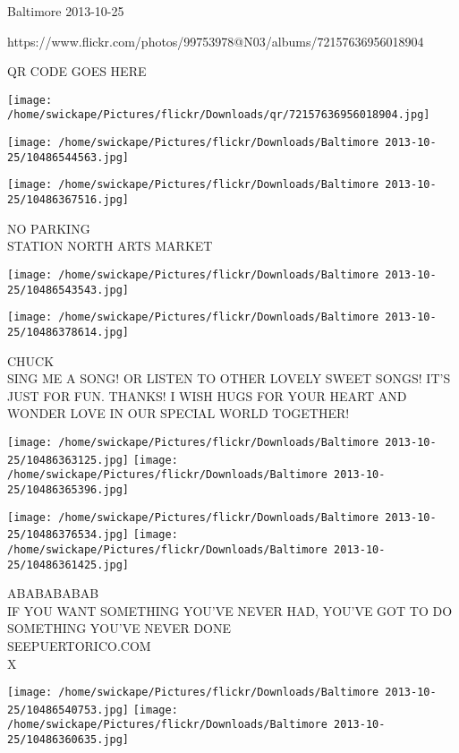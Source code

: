 \documentclass[10pt,letterpaper]{article}
\begin{document}
Baltimore 2013-10-25

https://www.flickr.com/photos/99753978@N03/albums/72157636956018904

QR CODE GOES HERE

\texttt{[image: /home/swickape/Pictures/flickr/Downloads/qr/72157636956018904.jpg]}
\pagebreak

\texttt{[image: /home/swickape/Pictures/flickr/Downloads/Baltimore 2013-10-25/10486544563.jpg]}

\vspace{0.25in}
\texttt{[image: /home/swickape/Pictures/flickr/Downloads/Baltimore 2013-10-25/10486367516.jpg]}

NO PARKING\\
STATION NORTH ARTS MARKET\\
\pagebreak

\texttt{[image: /home/swickape/Pictures/flickr/Downloads/Baltimore 2013-10-25/10486543543.jpg]}

\vspace{0.25in}
\texttt{[image: /home/swickape/Pictures/flickr/Downloads/Baltimore 2013-10-25/10486378614.jpg]}

CHUCK\\
SING ME A SONG!  OR LISTEN TO OTHER LOVELY SWEET SONGS! IT'S JUST FOR FUN. THANKS! I WISH HUGS FOR YOUR HEART AND WONDER LOVE IN OUR SPECIAL WORLD TOGETHER!\\
\pagebreak

\texttt{[image: /home/swickape/Pictures/flickr/Downloads/Baltimore 2013-10-25/10486363125.jpg]}
\texttt{[image: /home/swickape/Pictures/flickr/Downloads/Baltimore 2013-10-25/10486365396.jpg]}

\texttt{[image: /home/swickape/Pictures/flickr/Downloads/Baltimore 2013-10-25/10486376534.jpg]}
\texttt{[image: /home/swickape/Pictures/flickr/Downloads/Baltimore 2013-10-25/10486361425.jpg]}

ABABABABAB\\
IF YOU WANT SOMETHING YOU'VE NEVER HAD, YOU'VE GOT TO DO SOMETHING YOU'VE NEVER DONE\\
SEEPUERTORICO.COM\\
X\\
\pagebreak

\texttt{[image: /home/swickape/Pictures/flickr/Downloads/Baltimore 2013-10-25/10486540753.jpg]}
\texttt{[image: /home/swickape/Pictures/flickr/Downloads/Baltimore 2013-10-25/10486360635.jpg]}
\end{document}
